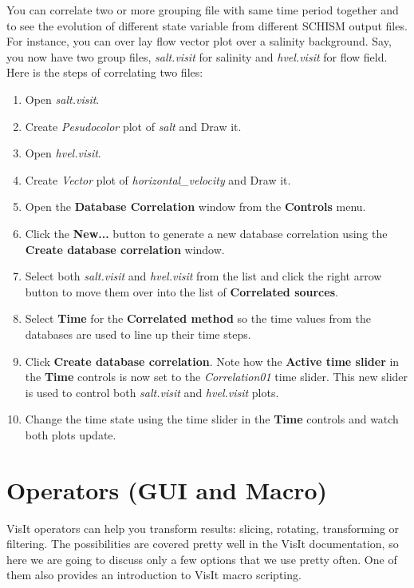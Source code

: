 \documentclass[12pt]{report}
\begin{document}
You can correlate two or more grouping file with same time period together and to see the evolution of different state variable from different SCHISM output files.  For instance, you can over lay flow vector plot over a salinity background.  Say, you now have two group files, \emph{salt.visit} for salinity and \emph{hvel.visit} for flow field. Here is the steps of correlating two files:
\begin{enumerate}
\item Open \emph{salt.visit}.
\item Create \emph{Pesudocolor} plot of \emph{salt} and Draw it.
\item Open \emph{hvel.visit}.
\item Create \emph{Vector}  plot of \emph{horizontal\_velocity} and Draw it.
\item Open the {\bf Database Correlation} window from the {\bf Controls} menu.
\item Click the {\bf New...} button to generate a new database correlation using the {\bf Create database correlation} window.
\item Select both \emph{salt.visit} and \emph{hvel.visit} from the list and click the right arrow button to move
      them over into the list of {\bf Correlated sources}.
\item Select {\bf Time} for the {\bf Correlated method} so the time values from the databases are used to line up their time steps.
\item Click {\bf Create database correlation}. Note how the {\bf Active time slider} in the {\bf Time} controls is now set to the
      \emph{Correlation01} time slider. This new slider is used to control both \emph{salt.visit} and \emph{hvel.visit} plots.
\item Change the time state using the time slider in the {\bf Time} controls and watch both plots update.
\end{enumerate}



\section{Operators (GUI and Macro)}
VisIt operators can help you transform results: slicing, rotating, transforming or filtering. The possibilities
are covered pretty well in the VisIt documentation, so here we are going to discuss only a few options that we
use pretty often. One of them also provides an introduction to VisIt macro scripting.
    
\end{document}
